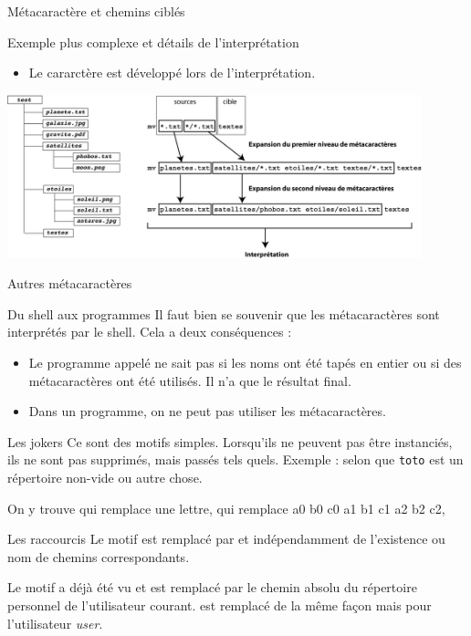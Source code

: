 \begin{frame}{Métacaractère et chemins ciblés}
  \begin{block}{Exemple plus complexe et détails de l'interprétation}
    \begin{itemize}
    \item Le cararctère \lin{*} est développé lors de l'interprétation.
    \end{itemize}
  \end{block}
  \begin{center}
    \includegraphics[width=12cm]{img/s02/star_met_mv_interp.jpg}
  \end{center}
\end{frame}
\begin{frame}{Autres métacaractères}
  \begin{alertblock}{Du shell aux programmes}
    Il faut bien se souvenir que les métacaractères sont interprétés par le shell. Cela a deux conséquences :
    \begin{itemize}
    \item Le programme appelé ne sait pas si les noms ont été tapés en entier ou si des métacaractères ont été utilisés. Il n'a que le résultat final.
    \item Dans un programme, on ne peut pas utiliser les métacaractères.
    \end{itemize}
  \end{alertblock}
  \begin{block}{Les jokers}
    Ce sont des motifs simples. Lorsqu'ils ne peuvent pas être
    instanciés, ils ne sont pas supprimés, mais passés tels
    quels. Exemple :  selon que \texttt{toto} est
    un répertoire non-vide ou autre chose.

    On y trouve  qui remplace une lettre, \lin{[a-c][0-2]} qui remplace a0 b0 c0 a1 b1 c1 a2 b2 c2, 

  \end{block}
  \begin{block}{Les raccourcis}
    Le motif  est remplacé par
     et  indépendamment de
    l'existence ou nom de chemins correspondants.
    
    Le motif \lin{\~} a déjà été vu et est remplacé par le chemin absolu
    du répertoire personnel de l'utilisateur courant.  est
    remplacé de la même façon mais pour l'utilisateur \emph{user}.
  \end{block}
\end{frame}
